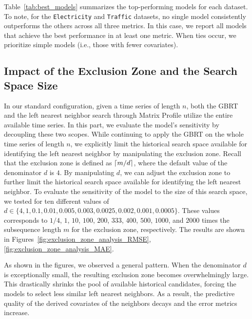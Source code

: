 
Table~\ref{tab:best_models} summarizes the top-performing models for each dataset. 
To note, for the \texttt{Electricity} and \texttt{Traffic} datasets, no single model consistently outperforms the others across all three metrics. 
In this case, we report all models that achieve the best performance in at least one metric. When ties occur, we prioritize simple models (i.e., those with fewer covariates).

\subsection{Impact of the Exclusion Zone and the Search Space Size} %




In our standard configuration, given a time series of length $n$, both the GBRT and the left nearest neighbor search through Matrix Profile utilize the entire available time series. 
%
In this part, we evaluate the model's sensitivity by decoupling these two scopes. 
While continuing to apply the GBRT on the whole time series of length $n$, we explicitly limit the historical search space available for identifying the left nearest neighbor by manipulating the exclusion zone. 
%
Recall that the exclusion zone is defined as $\lceil m/d\rceil$, where the default value of the denominator $d$ is $4$.
By manipulating $d$, we can adjust the exclusion zone to further limit the historical search space available for identifying the left nearest neighbor.
To evaluate the sensitivity of the model to the size of this search space, we tested for ten different values of $d \in \{ 4, 1, 0.1, 0.01, 0.005, 0.003, 0.0025, 0.002, 0.001, 0.0005 \}$.
These values corresponds to $1/4$, $1$, $10$, $100$, $200$, $333$, $400$, $500$, $1000$, and  $2000$ times the subsequence length $m$ for the exclusion zone, respectively.
The results are shown in Figures~\ref{fig:exclusion_zone_analysis_RMSE}, \ref{fig:exclusion_zone_analysis_MAE}.

As shown in the figures, we observed a general pattern. 
When the denominator $d$ is exceptionally small, the resulting exclusion zone becomes overwhelmingly large. 
This drastically shrinks the pool of available historical candidates, forcing the models to select less similar left nearest neighbors. 
As a result, the predictive quality of the derived covariates of the neighbors decays and the error metrics increase.

